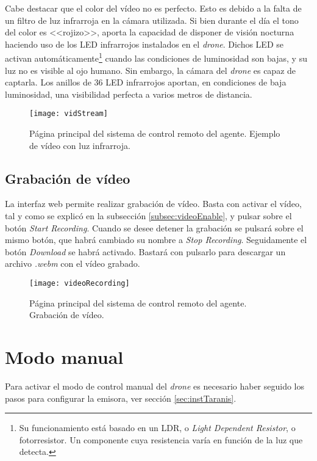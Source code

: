 Cabe destacar que el color del vídeo no es perfecto. Esto es debido a la falta de un filtro de luz infrarroja en la cámara utilizada. Si bien durante el día el tono del color es <<rojizo>>, aporta la capacidad de disponer de visión nocturna haciendo uso de los LED infrarrojos instalados en el \emph{drone}. Dichos LED se activan automáticamente\footnote{Su funcionamiento está basado en un LDR, o \emph{Light Dependent Resistor}, o fotorresistor. Un componente cuya resistencia varía en función de la luz que detecta.} cuando las condiciones de luminosidad son bajas, y su luz no es visible al ojo humano. Sin embargo, la cámara del \emph{drone} es capaz de captarla. Los anillos de 36 LED infrarrojos aportan, en condiciones de baja luminosidad, una visibilidad perfecta a varios metros de distancia. 

\begin{figure}[H]
	\centering
	\texttt{[image: vidStream]}
	\caption[Página principal. Gestión de vídeo. Nocturno.]{Página principal del sistema de control remoto del agente. Ejemplo de vídeo con luz infrarroja.}\label{fig:samplevidenight}
\end{figure}


\subsection{Grabación de vídeo}
La interfaz web permite realizar grabación de vídeo. Basta con activar el vídeo, tal y como se explicó en la subsección \ref{subsec:videoEnable}, y pulsar sobre el botón \emph{Start Recording}. Cuando se desee detener la grabación se pulsará sobre el mismo botón, que habrá cambiado su nombre a \emph{Stop Recording}. Seguidamente el botón \emph{Download} se habrá activado. Bastará con pulsarlo para descargar un archivo \emph{.webm} con el vídeo grabado.

\begin{figure}[H]
	\centering
	\texttt{[image: videoRecording]}
	\caption[Página principal. Gestión de vídeo. Grabación.]{Página principal del sistema de control remoto del agente. Grabación de vídeo.}\label{fig:userManualRecordVideo}
\end{figure}

\section{Modo manual}

Para activar el modo de control manual del \emph{drone} es necesario haber seguido los pasos para configurar la emisora, ver sección \ref{sec:instTaranis}. 

